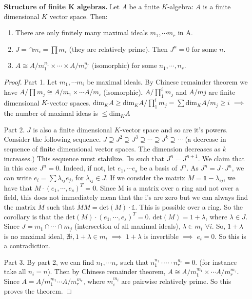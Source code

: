 \begin{theorem} \textbf{Structure of finite K algebras.} Let $A$ be a finite $K$-algebra:  $A$ is a finite dimensional $K$ vector space. Then:
\begin{enumerate}
\item There are only finitely many maximal ideals $m_1, \cdots m_r$ in A.
\item $J=\cap m_i=\prod m_i$ (they are relatively prime). Then $J^n= 0$ for some $n$. 
\item $A\cong A/m_1^{n_1}\times\cdots\times A/m_r^{n_r}$ (isomorphic) for some $n_1,\cdots,n_r$.
\end{enumerate}
\end{theorem}

\begin{proof}
Part 1. Let $m_1,\cdots m_i$ be maximal ideals. By Chinese remainder theorem we have $A/\prod m_j\cong A/m_1\times\cdots A/m_i$ (isomorphic).  $A/\prod^i_1 m_j$ and $A/mj$ are finite dimensional $K$-vector spaces.  $\text{dim}_KA\geq \text{dim}_KA/\prod^i_1 m_j=\sum \text{dim}_KA/m_j\geq i$ $\implies$ the number of maximal ideas is $\leq \text{dim}_KA$

Part 2. $J$ is also a finite dimensional $K$-vector space and so are it's powers. Consider the following sequence. $J\supseteq J^2\supseteq J^3\supseteq \cdots \supseteq J^k \supseteq \cdots$ (a decrease in sequence of finite dimensional vector spaces. The dimension decreases as $k$ increases.) This sequence must stabilize. $\exists n$ such that $J^n=J^{n + 1}$. We claim that in this case $J^n= 0$. Indeed, if not, let $e_1,\cdots e_s$ be a basis of $J^n$. As $J^n=J\cdot J^n$, we can write $e_i=\sum\lambda_{ij} e_j$, for $\lambda_{ij}\in J$. If we consider the matrix $M=\mathds{1} -\lambda_{ij}$, we have that $M \cdot (e_1,\cdots,e_s)^T=0$. Since M is a matrix over a ring and not over a field, this does not immediately mean that the i's are zero but we can always find the matrix $\widetilde{M}$ such that $\widetilde{M}M=\text{det}(M)\cdot\mathds{1}$. This is possible over a ring. So the corollary is that the $\text{det}(M)\cdot (e_1,\cdots,e_s)^T=0$. $\text{det}(M)=1 + \lambda$, where $\lambda \in J$. Since $J=m_1\cap\cdots\cap m_j$ (intersection of all maximal ideals), $\lambda \in m_i$ $\forall i$. So, $1 + \lambda$ is no maximal ideal, $\nexists i, 1+\lambda\in m_i$ $\implies$ $1 + \lambda$ is invertible $\implies$ $e_i=0$. So this is a contradiction. 

Part 3. By part 2, we can find $n_1,\cdots n_r$ such that $n_1^{n_1}\cdot\cdots\cdot n_r^{n_r}=0$. (for instance take all $n_i=n$). Then by Chinese remainder theorem, $A\cong A/m_1^{m_1}\times\cdots A/m_r^{m_r}$. Since $A=A/m_1^{m_1}\cdots A/m_r^{m_r}$, where $m_i^{m_i}$ are pairwise relatively prime. So this proves the theorem. 
\end{proof}

